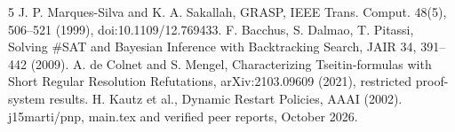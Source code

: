 \documentclass[11pt]{article}
\begin{document}
\begin{thebibliography}{5}
 J. P. Marques-Silva and K. A. Sakallah, GRASP, IEEE Trans. Comput. 48(5), 506--521 (1999), doi:10.1109/12.769433.
 F. Bacchus, S. Dalmao, T. Pitassi, Solving \#SAT and Bayesian Inference with Backtracking Search, JAIR 34, 391--442 (2009).
 A. de Colnet and S. Mengel, Characterizing Tseitin-formulas with Short Regular Resolution Refutations, arXiv:2103.09609 (2021), restricted proof-system results.
 H. Kautz et al., Dynamic Restart Policies, AAAI (2002).
 j15marti/pnp, main.tex and verified peer reports, October 2026.
\end{thebibliography}
\end{document}
